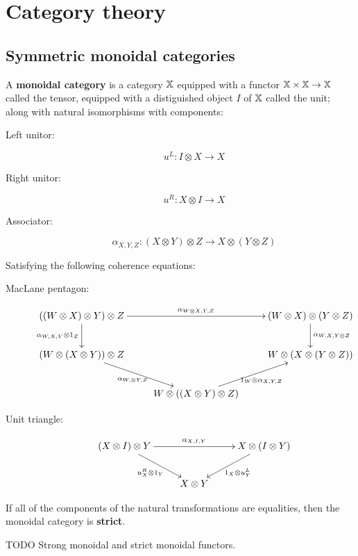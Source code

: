 
\section{Category theory}






\subsection{Symmetric monoidal categories}
\begin{definition}
A {\bf monoidal category} is a category $\mathbb{X}$ equipped with a functor $\mathbb{X}\times\mathbb{X}\to \mathbb{X}$ called the tensor, equipped with a distiguished object $I$ of $\mathbb{X}$ called the unit; along with natural isomorphisms with components:

\begin{description}
\item[Left unitor:]
$$
u^L:I\otimes X \to X
$$
\item[Right unitor:]
$$
u^R: X\otimes I \to X
$$
\item[Associator:]
$$
\alpha_{X,Y,Z}:(X\otimes Y)\otimes Z \to X\otimes(Y\otimes Z)
$$
\end{description}

Satisfying the following coherence equations:

\begin{description}
\item[MacLane pentagon:]


$$
\xymatrix{
  ((W\otimes X )\otimes Y)\otimes Z \ar[rr]^{\alpha_{W\otimes X,Y,Z}} \ar[d]_{\alpha_{W,X,Y}\otimes 1_Z}
    &
    & (W\otimes X )\otimes (Y\otimes Z) \ar[d]^{\alpha_{W, X,Y\otimes Z}}
  \\  (W\otimes(X\otimes Y))\otimes Z \ar[dr]_{\alpha_{W,\otimes Y,Z}}
    & 
    & W\otimes (X\otimes(Y\otimes Z)) 
  \\&
    W\otimes ((X\otimes Y)\otimes Z) \ar[ur]_{1_W\otimes \alpha_{X,Y,Z}}
}
$$

\item[Unit triangle:]

$$
\xymatrix{
  (X\otimes I)\otimes Y \ar[rr]^{\alpha_{X,I,Y}} \ar[dr]_{u_X^{R}\otimes 1_Y}
    &
    & X\otimes (I\otimes Y) \ar[dl]^{1_X\otimes u_Y^{L}}\\
  & X\otimes Y
}
$$

\end{description}

If all of the components of the natural transformations are equalities, then the monoidal category is {\bf strict}.


TODO Strong monoidal and strict monoidal functors.
\end{definition}

